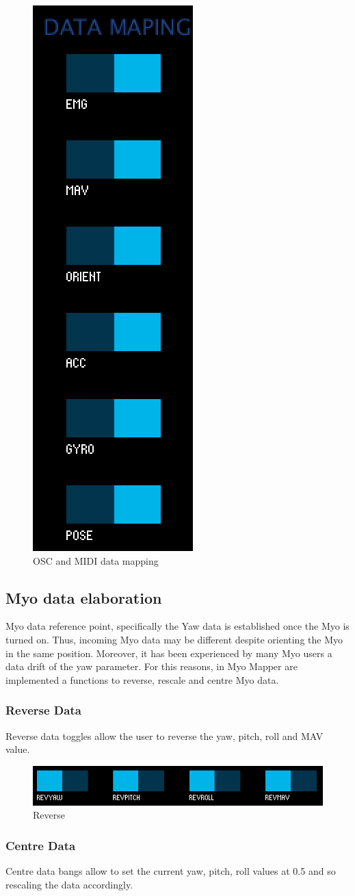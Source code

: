 \documentclass[12pt,a4paper]{article}
\begin{document}
		\begin{figure}[h]
			\centering
			\includegraphics[height=0.6\linewidth]{../images/MyoMapper-DataMapping}
			\caption{OSC and MIDI data mapping}
			\label{fig:MyoMapper-DataMapping}
		\end{figure}
		
		\subsection{Myo data elaboration}
		Myo data reference point, specifically the Yaw data is established once the Myo is turned on. Thus, incoming Myo data may be different despite orienting the Myo in the same position. Moreover, it has been experienced by many Myo users a data drift of the yaw parameter.
		For this reasons, in Myo Mapper are implemented a functions to reverse, rescale and centre Myo data.
		
		\subsubsection*{Reverse Data} 
		Reverse data toggles allow the user to reverse the yaw, pitch, roll and MAV value.
		
		\begin{figure}[h]
			\centering
			\includegraphics[width=0.6\linewidth]{../images/MyoMapper-Rev}
			\caption{Reverse}
			\label{fig:MyoMapper-Rev}
		\end{figure}		

		\subsubsection*{Centre Data}
		Centre data bangs allow to set the current yaw, pitch, roll values at 0.5 and so rescaling the data accordingly.
		
\end{document}
